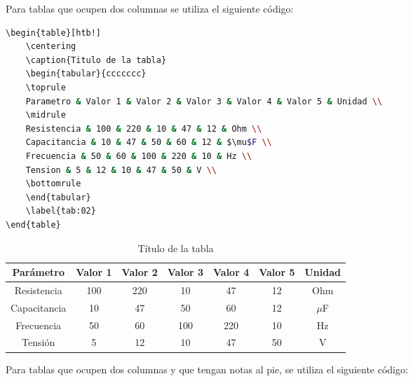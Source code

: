 \documentclass[12pt]{difu100cia} %
\begin{document}
Para tablas que ocupen dos columnas se utiliza el siguiente código:

\begin{lstlisting}[language=bash]
\begin{table*}[htb!]
    \centering
    \caption{Titulo de la tabla}
    \begin{tabular}{ccccccc}
    \toprule
    Parametro & Valor 1 & Valor 2 & Valor 3 & Valor 4 & Valor 5 & Unidad \\
    \midrule
    Resistencia & 100 & 220 & 10 & 47 & 12 & Ohm \\
    Capacitancia & 10 & 47 & 50 & 60 & 12 & $\mu$F \\
    Frecuencia & 50 & 60 & 100 & 220 & 10 & Hz \\
    Tension & 5 & 12 & 10 & 47 & 50 & V \\
    \bottomrule
    \end{tabular}
    \label{tab:02}
\end{table*}
\end{lstlisting}

\begin{table*}[htb!]
    \centering
    \caption{Título de la tabla}
    \begin{tabular}{ccccccc}
    \toprule
    Parámetro & Valor 1 & Valor 2 & Valor 3 & Valor 4 & Valor 5 & Unidad \\
    \midrule
    Resistencia & 100 & 220 & 10 & 47 & 12 &Ohm \\
    Capacitancia & 10 & 47 & 50 & 60 & 12 & $\mu$F \\
    Frecuencia & 50 & 60 & 100 & 220 & 10 & Hz \\
    Tensión & 5 & 12 & 10 & 47 & 50 & V \\
    \bottomrule
    \end{tabular}
    \label{tab:02}
\end{table*}

Para tablas que ocupen dos columnas y que tengan notas al pie, se utiliza el siguiente código:
\end{document}
